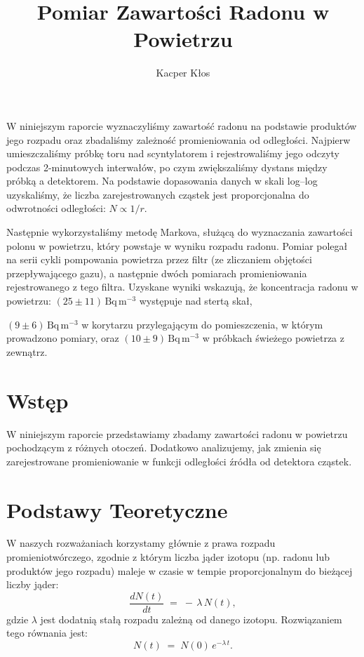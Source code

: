 \documentclass[12pt]{article}
\title{Pomiar Zawartości Radonu w Powietrzu}
\author{Kacper Kłos}
\begin{document}
\maketitle

W niniejszym raporcie wyznaczyliśmy zawartość radonu na podstawie produktów jego rozpadu oraz zbadaliśmy zależność promieniowania od odległości. Najpierw umieszczaliśmy próbkę toru nad scyntylatorem i rejestrowaliśmy jego odczyty podczas 2-minutowych interwałów, po czym zwiększaliśmy dystans między próbką a detektorem. Na podstawie dopasowania danych w skali log–log uzyskaliśmy, że liczba zarejestrowanych cząstek jest proporcjonalna do odwrotności odległości: \(N \propto 1/r\).

Następnie wykorzystaliśmy metodę Markova, służącą do wyznaczania zawartości polonu w powietrzu, który powstaje w wyniku rozpadu radonu. Pomiar polegał na serii cykli pompowania powietrza przez filtr (ze zliczaniem objętości przepływającego gazu), a następnie dwóch pomiarach promieniowania rejestrowanego z tego filtra. Uzyskane wyniki wskazują, że koncentracja radonu w powietrzu: \((25 \pm 11)\,\mathrm{Bq\,m^{-3}}\) występuje nad stertą skał, 

\((9 \pm 6)\,\mathrm{Bq\,m^{-3}}\) w korytarzu przylegającym do pomieszczenia, w którym prowadzono pomiary, oraz \((10 \pm 9)\,\mathrm{Bq\,m^{-3}}\) w próbkach świeżego powietrza z zewnątrz.


\newpage

\section{Wstęp}
W niniejszym raporcie przedstawiamy zbadamy zawartości radonu w powietrzu pochodzącym z różnych otoczeń. Dodatkowo analizujemy, jak zmienia się zarejestrowane promieniowanie w funkcji odległości źródła od detektora cząstek.

\section{Podstawy Teoretyczne}
W naszych rozważaniach korzystamy głównie z prawa rozpadu promieniotwórczego, zgodnie z którym liczba jąder izotopu (np. radonu lub produktów jego rozpadu) maleje w czasie w tempie proporcjonalnym do bieżącej liczby jąder:
\[
\frac{dN(t)}{dt} \;=\; -\,\lambda\,N(t),
\]
gdzie \(\lambda\) jest dodatnią stałą rozpadu zależną od danego izotopu. Rozwiązaniem tego równania jest:
\begin{equation}
	N(t) \;=\; N(0)\,e^{-\lambda\,t}.
	\label{eq:decay}
\end{equation}
\end{document}
